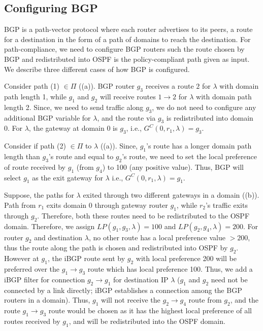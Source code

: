 \subsection{Configuring BGP}
BGP is a path-vector protocol where each router 
advertises to its peers, 
a route for a destination in the form 
of a path of domains to reach the destination.  
For path-compliance, we need to configure
BGP routers such the route chosen by BGP
and redistributed into OSPF is the policy-compliant
path given as input. We describe three different
cases of how BGP is configured.  

Consider path (1) $\in \Pi$ ((a)).
BGP router $g_3$ receives a route $2$ for $\lambda$ with domain path length 1, 
while $g_1$ and $g_2$ will receive routes $1 \rightarrow 2$ 
for $\lambda$ with 
domain path length 2. Since, we need to send traffic along
$g_3$, we do not need to configure any additional BGP variable for $\lambda$,
and the route via $g_3$ is redistributed into domain 0. 
For $\lambda$, the gateway at domain 0 is $g_3$, i.e.,
$G^C(0, r_1, \lambda) = g_3$.

Consider if path (2) $\in \Pi$ to $\lambda$ 
((a)). Since, $g_1$'s route has a longer domain 
path length than $g_3$'s route and equal to $g_2$'s route,
we need to set the local preference of route received by $g_1$ 
(from $g_4$) to 100 (any positive value). Thus, BGP 
will select $g_1$ as the exit gateway for $\lambda$ i.e.,
$G^C(0, r_1, \lambda) = g_1$.

Suppose, the paths for $\lambda$ exited through two different
gateways in a domain ((b)).
Path from $r_1$ exits domain 0 through 
gateway router $g_1$, while $r_2$'s traffic exits 
through $g_2$. 
Therefore, both these routes need to be 
redistributed to the OSPF domain. 
Therefore, we assign
$LP(g_1,g_3,\lambda) = 100$ and $LP(g_2,g_4,\lambda) = 200$. For 
router $g_2$ and destination $\lambda$, 
no other route has a local preference value $>200$, thus 
the route along the path is chosen and redistributed into 
OSPF by $g_2$. However at $g_1$, the iBGP route
sent by $g_2$ with local preference 200 will be preferred over
the $g_1\rightarrow g_3$ route which has local preference 100.
Thus, we add a iBGP filter for connection $g_2 \rightarrow g_1$ for
destination IP $\lambda$ ($g_1$ and $g_2$ need not be connected by a 
link directly; iBGP establishes a connection among the 
BGP routers in a domain). Thus, $g_1$ will not receive the
$g_2 \rightarrow g_4$ route from $g_2$, and the route $g_1 \rightarrow
g_3$ route would be chosen as it has the highest local preference
of all routes received by $g_1$, and will be redistributed into the 
OSPF domain. 

